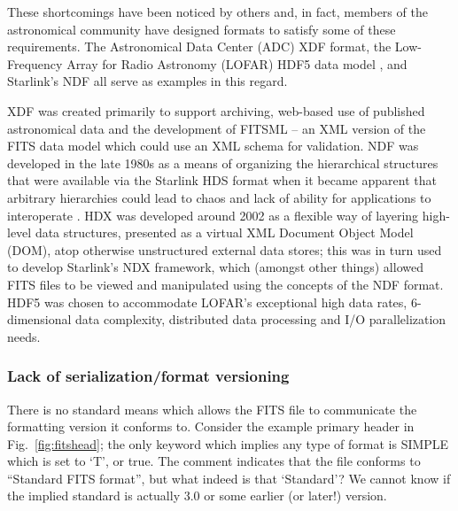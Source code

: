 \documentclass[final,authoryear,5p,times,twocolumn]{elsarticle}
\begin{document}
{{These shortcomings have been noticed by others and, in fact, members 
of the astronomical community have designed formats to satisfy some 
of these requirements. The Astronomical Data Center (ADC) XDF
format, the Low-Frequency Array for Radio Astronomy (LOFAR) HDF5 data
model \citep{2012ASPC..461..283A}, and Starlink's NDF
\citep{1988STARB...2...11C,1993ASPC...52..229W,P91_adassxxiii} all
serve as examples in this regard. 

XDF was created primarily to support archiving, web-based use of 
published astronomical data and the development of FITSML -- an XML version 
of the FITS data model which could use an XML schema for validation. 
NDF was developed in the late
1980s as a means of organizing the hierarchical structures that were
available via the Starlink HDS format when it became apparent that
arbitrary hierarchies could lead to chaos and lack of ability for
applications to interoperate \citep{2014Jenness}.
HDX \citep{2003ASPC..295..221G} was developed around 2002 as a flexible
way of layering high-level data structures, presented as a virtual XML
Document Object Model (DOM), atop otherwise unstructured external data stores; this was in
turn used to develop Starlink's NDX framework, which (amongst other
things) allowed FITS files to be viewed and manipulated using the
concepts of the NDF format.
HDF5 was chosen to accommodate LOFAR's
exceptional high data rates, 6-dimensional data complexity, distributed
data processing and I/O parallelization needs.


\subsubsection{Lack of serialization/format versioning}
\label{lack_of_serialization}


There is no standard means which allows the FITS file to
communicate the formatting version it conforms to.  Consider the example primary header
in Fig.~\ref{fig:fitshead}; the only keyword which implies any type of
format is SIMPLE which is set to `T', or true. The comment indicates that
the file conforms to ``Standard FITS format'', but what indeed is that `Standard'?
We cannot know if the implied standard is actually 3.0 or some earlier (or later!)
version.


}}
\end{document}
